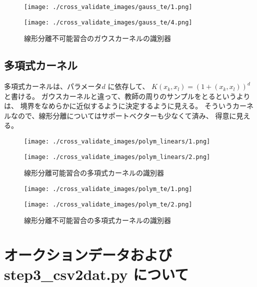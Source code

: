 \documentclass[]{jsarticle}
\begin{document}
\begin{figure}[htbp]
 \begin{minipage}[b]{0.5\hsize}
  \texttt{[image: ./cross\_validate\_images/gauss\_te/1.png]}
 \end{minipage}
 \begin{minipage}[b]{0.5\hsize}
  \texttt{[image: ./cross\_validate\_images/gauss\_te/4.png]}
 \end{minipage}
 \caption{線形分離不可能習合のガウスカーネルの識別器}
\end{figure}

\newpage
\subsection{多項式カーネル}
多項式カーネルは、パラメータ$d$ に依存して、
$K(x_k,x_l) = (1+(x_k,x_l))^d $ と書ける。
ガウスカーネルと違って、教師の周りのサンプルをとるというよりは、
境界をなめらかに近似するように決定するように見える。
そういうカーネルなので、線形分離についてはサポートベクターも少なくて済み、
得意に見える。

\begin{figure}[htbp]
 \begin{minipage}[b]{0.5\hsize}
  \texttt{[image: ./cross\_validate\_images/polym\_linears/1.png]}
 \end{minipage}
 \begin{minipage}[b]{0.5\hsize}
  \texttt{[image: ./cross\_validate\_images/polym\_linears/2.png]}
 \end{minipage}
 \caption{線形分離可能習合の多項式カーネルの識別器}
\end{figure}

\begin{figure}[htbp]
 \begin{minipage}[b]{0.5\hsize}
  \texttt{[image: ./cross\_validate\_images/polym\_te/1.png]}
 \end{minipage}
 \begin{minipage}[b]{0.5\hsize}
  \texttt{[image: ./cross\_validate\_images/polym\_te/2.png]}
 \end{minipage}
 \caption{線形分離不可能習合の多項式カーネルの識別器}
\end{figure}
\fi

\section{ オークションデータおよびstep3\_csv2dat.py について}
\end{document}
